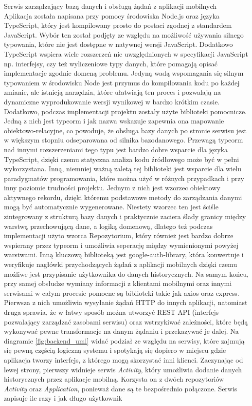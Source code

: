 \documentclass[a4paper,twoside,12pt]{book}
\begin{document}
\begin{description}
\item Serwis zarządzający bazą danych i obsługą żądań z aplikacji mobilnych  \hfill \\
Aplikacja została napisana przy pomocy środowiska Node.js oraz języka TypeScript, który jest kompilowany prosto do postaci zgodnej z standardem JavaScript. Wybór ten został podjęty ze względu na możliwość używania silnego typowania, które nie jest dostępne w natywnej wersji JavaScript. Dodatkowo TypeScript wspiera wiele rozszerzeń nie uwzględnionych w  specyfikacji JavaScript np. interfejsy, czy też wyliczeniowe typy danych, które pomagają opisać implementacje zgodnie domeną problemu. Jedyną wadą wspomagania się silnym typowaniem w środowisku Node jest przymus do kompilowania kodu po każdej zmianie, ale istnieją narzędzia, które ułatwiają ten proces i pozwalają na dynamiczne wyprodukowanie wersji wynikowej w bardzo krótkim czasie. Dodatkowo, podczas implementacji projektu zostały użyte biblioteki pomocnicze. Jedną z nich jest typeorm\cite{typeorm} i jak nazwa wskazuje zapewnia ona mapowanie obiektowo-relacyjne, co powoduje, że obsługa bazy danych po stronie serwisu jest w większym stopniu odseparowana od silnika bazodanowego. Przewagą typeorm nad innymi rozszerzeniami tego typu jest bardzo dobre wsparcie dla języka TypeScript, dzięki czemu statyczna analiza kodu źródłowego może być w pełni wykorzystana. Inną, niemniej ważną zaletą tej biblioteki jest wsparcie dla wielu paradygmatów programowania, które można użyć w różnych przypadkach i przy inny poziomie trudności projektu. Jednym z nich jest wzorzec obiektowy aktywnego rekordu, dzięki któremu podstawowe metody do zarządzania danymi mogą być automatycznie wygenerowane. Niestety wzorzec ten jest ściśle zintegrowany z strukturą bazy danych i praktycznie zaciera ślady granicy między warstwą przechowującą dane, a logiką domenową, dlatego też podczas implementacji użyto wzorca Repozytorium, który również jest bardzo dobrze wspierany przez typeorm i umożliwia seperację między wymienionymi powyżej warstwami. Inną kluczową biblioteką jest google-auth-library, która konwertuje i weryfikuje nagłówki przychodzących żądań z aplikacji mobilnych dzięki czemu możliwe jest przypisanie użytkownika do danych historycznych. Na samym końcu, przy samej obsłudze wymiany informacji z klientami mobilnymi oraz innymi serwisami w całym procesie pomocne są biblioteki takie jak axios oraz express. Pierwsza z nich umożliwia wysyłanie żądań HTTP do innych aplikacji, natomiast druga sprawia, że w łatwy sposób można utworzyć REST API (interfejs pozwalający zarządzać zasobami serwisu) oraz wstrzykiwać zależności, które będą wykonywać pewne transformacje na danym żądaniu i przekazywać je dalej. Na diagramie \ref{fig:backend_uml} widać podział ze względu na serwisy, które zajmują się pewną częścią logiczną systemu i spotykają się dopiero w miejscu gdzie aplikacja tworzy interfejs, z którego mogą skorzystać inni klienci. Zaczynając od lewej strony, pierwszy widnieje serwis \textit{Activity}, który umożliwia dodanie danych historycznych przez aplikacje mobilną. Korzysta on z dwóch repozytoriów \textit{Activity} oraz \textit{Application}, ponieważ dane są te bezpośrednio połączone. Serwis zapisuje ile razy i jak długo użytkownik 
\end{description}
\end{document}
